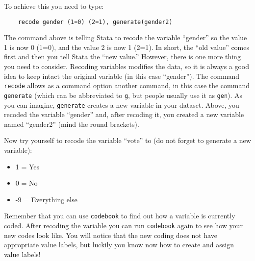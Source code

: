 \documentclass{article}
\begin{document}
To achieve this you need to type:

\begin{lstlisting}
	recode gender (1=0) (2=1), generate(gender2) 
\end{lstlisting}

The command above is telling Stata to recode the variable ``gender'' so the value 1 is now 0 (1=0), and the value 2 is now 1 (2=1). In short, the ``old value'' comes first and then you tell Stata the ``new value.'' However, there is one more thing you need to consider. Recoding variables modifies the data, so it is always a good idea to keep intact the original variable (in this case ``gender''). The command \texttt{recode} allows as a command option another command, in this case the command \texttt{generate} (which can be abbreviated to \texttt{g}, but people usually use it as \texttt{gen}). As you can imagine, \texttt{generate} creates a new variable in your dataset. Above, you recoded the variable ``gender'' and, after recoding it, you created a new variable named ``gender2'' (mind the round brackets).

Now try yourself to recode the variable ``vote'' to (do not forget to generate a new variable):

\begin{itemize}
	\item 1 = Yes
	\item 0 = No
	\item -9 = Everything else
\end{itemize}

Remember that you can use \texttt{codebook} to find out how a variable is currently coded. After recoding the variable you can run \texttt{codebook} again to see how your new codes look like. You will notice that the new coding does not have appropriate value labels, but luckily you know now how to create and assign value labels!
\end{document}
